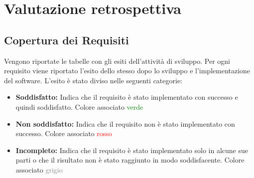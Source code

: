 
\chapter{Valutazione retrospettiva} %

\label{Chapter4} %



\section{Copertura dei Requisiti}

Vengono riportate le tabelle con gli esiti dell'attività di sviluppo. Per ogni
requisito viene riportato l'esito dello stesso dopo lo sviluppo e l'implementazione del
software. L'esito è stato diviso nelle seguenti categorie:
\begin{itemize}
\item \textbf{Soddisfatto:} Indica che il requisito è stato implementato con successo e quindi
soddisfatto. Colore associato \textcolor{green}{verde}
\item \textbf{Non soddisfatto:} Indica che il requisito non è stato implementato con successo.
Colore associato \textcolor{red}{rosso}
\item \textbf{Incompleto:} Indica che il requisito è stato implementato solo in alcune sue
parti o che il risultato non è stato raggiunto in modo soddisfacente. Colore associato \textcolor{gray}{grigio}
\end{itemize}

